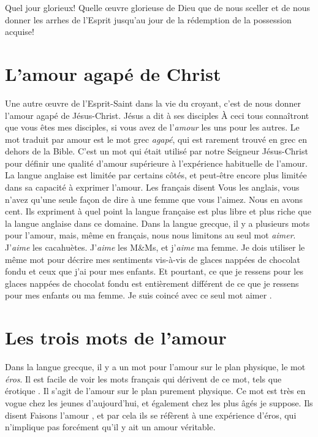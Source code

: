 Quel jour glorieux! Quelle œuvre glorieuse de Dieu que de nous sceller
 et de nous donner les arrhes de l'Esprit jusqu'au jour de la rédemption
 de la possession acquise!


\section{L'amour agap\'e de Christ}

Une autre œuvre de l'Esprit-Saint dans la vie du croyant,
 c'est de nous donner l'amour agapé de Jésus-Christ.
 Jésus a dit à ses disciples\frcolon{}
 \Og À ceci tous connaîtront que vous êtes mes disciples,
 si vous avez de l'\emph{amour} les uns pour les autres. \Fg{}
 Le mot traduit par \Og amour \Fg{} est le mot grec \emph{agapé},
 qui est rarement trouvé en grec en dehors de la Bible.
 C'est un mot qui était utilisé par notre Seigneur Jésus-Christ
 pour définir une qualité d'amour supérieure à l'expérience habituelle
 de l'amour.
 La langue anglaise est limitée par certains côtés,
 et peut-être encore plus limitée dans sa capacité à exprimer l'amour.
 Les français disent\frcolon{}
 \Og Vous les anglais, vous n'avez qu'une seule façon de dire à une femme
 que vous l'aimez. Nous en avons cent. \Fg{}
 Ils expriment à quel point la langue française est plus libre et plus riche
 que la langue anglaise dans ce domaine.
 Dans la langue grecque, il y a plusieurs mots pour l'amour,
 mais, même en français, nous nous limitons au seul mot \emph{aimer}.
 J'\emph{aime} les cacahuètes. J'\emph{aime} les M\&Ms,
 et j'\emph{aime} ma femme.
 Je dois utiliser le même mot pour décrire mes sentiments
 vis-à-vis de glaces nappées de chocolat fondu et ceux que j'ai
 pour mes enfants. Et pourtant, ce que je ressens pour les glaces nappées
 de chocolat fondu est entièrement différent de ce que je ressens
 pour mes enfants ou ma femme.
 Je suis coincé avec ce seul mot \Og aimer \Fg{}.


\section{Les trois mots de l'amour}

Dans la langue grecque, il y a un mot pour l'amour sur le plan physique,
 le mot \emph{éros}.
 Il est facile de voir les mots français qui dérivent de ce mot,
 tels que \Og érotique \Fg{}.
 Il s'agit de l'amour sur le plan purement physique.
 Ce mot est très en vogue chez les jeunes d'aujourd'hui,
 et également chez les plus âgés je suppose. Ils disent\frcolon{}
 \Og Faisons l'amour \Fg{}, et par cela ils se réfèrent
 à une expérience  d'éros, qui n'implique pas forcément
 qu'il y ait un amour véritable.

